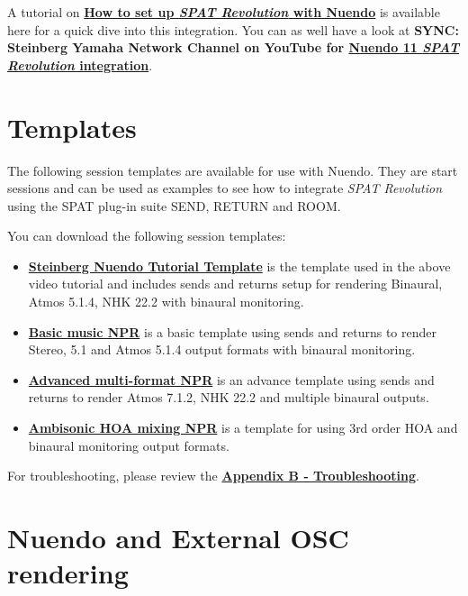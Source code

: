\documentclass[
  letterpaper,
  DIV=11,
  numbers=noendperiod]{scrreport}
\begin{document}
A tutorial on \textbf{\href{https://youtu.be/DIE2RiB_i8I}{How to set up
\emph{SPAT Revolution} with Nuendo}} is available here for a quick dive
into this integration. You can as well have a look at \textbf{SYNC:
Steinberg Yamaha Network Channel on YouTube for
\href{https://www.youtube.com/watch?v=ZW6VveWqYuA}{Nuendo 11 \textbar{}
\emph{SPAT Revolution} integration}}.

\hypertarget{templates-3}{%
\section{Templates}\label{templates-3}}

The following session templates are available for use with Nuendo. They
are start sessions and can be used as examples to see how to integrate
\emph{SPAT Revolution} using the SPAT plug-in suite SEND, RETURN and
ROOM.

You can download the following session templates:

\begin{itemize}
\item
  \textbf{\href{https://public.3.basecamp.com/p/CsyXhCZjbdBXj8rrrDRSAV5w}{Steinberg
  Nuendo Tutorial Template}} is the template used in the above video
  tutorial and includes sends and returns setup for rendering Binaural,
  Atmos 5.1.4, NHK 22.2 with binaural monitoring.
\item
  \textbf{\href{https://public.3.basecamp.com/p/yRVeYRi4Co8mRm3FFU4Zhjt6}{Basic
  music NPR}} is a basic template using sends and returns to render
  Stereo, 5.1 and Atmos 5.1.4 output formats with binaural monitoring.
\item
  \textbf{\href{https://public.3.basecamp.com/p/TMikxYY8Z9D1dnkaAgG9uFE8}{Advanced
  multi-format NPR}} is an advance template using sends and returns to
  render Atmos 7.1.2, NHK 22.2 and multiple binaural outputs.
\item
  \textbf{\href{https://public.3.basecamp.com/p/FgvZBZWodG9qUVCGtuXSxCFk}{Ambisonic
  HOA mixing NPR}} is a template for using 3rd order HOA and binaural
  monitoring output formats.
\end{itemize}

For troubleshooting, please review the
\textbf{\href{Appendix_B.md}{Appendix B - Troubleshooting}}.

\hypertarget{nuendo-and-external-osc-rendering}{%
\section{Nuendo and External OSC
rendering}\label{nuendo-and-external-osc-rendering}}
\end{document}
